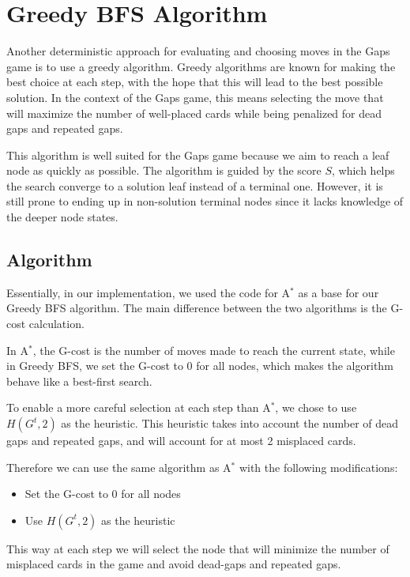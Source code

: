 \chapter{Greedy BFS Algorithm}
Another deterministic approach for evaluating and choosing moves in the Gaps game is to use a greedy algorithm. Greedy algorithms are known for making the best choice at each step, with the hope that this will lead to the best possible solution. In the context of the Gaps game, this means selecting the move that will maximize the number of well-placed cards while being penalized for dead gaps and repeated gaps.

This algorithm is well suited for the Gaps game because we aim to reach a leaf node as quickly as possible. The algorithm is guided by the score $S$, which helps the search converge to a solution leaf instead of a terminal one. However, it is still prone to ending up in non-solution terminal nodes since it lacks knowledge of the deeper node states.

\section{Algorithm}
Essentially, in our implementation, we used the code for A$^*$ as a base for our Greedy BFS algorithm. The main difference between the two algorithms is the G-cost calculation.

In A$^*$, the G-cost is the number of moves made to reach the current state, while in Greedy BFS, we set the G-cost to 0 for all nodes, which makes the algorithm behave like a best-first search.

To enable a more careful selection at each step than A$^*$, we chose to use $H(G^t, 2)$ as the heuristic. This heuristic takes into account the number of dead gaps and repeated gaps, and will account for at most 2 misplaced cards.

Therefore we can use the same algorithm as A$^*$ with the following modifications:
\begin{itemize}
    \item Set the G-cost to 0 for all nodes
    \item Use $H(G^t, 2)$ as the heuristic
\end{itemize}

This way at each step we will select the node that will minimize the number of misplaced cards in the game and avoid dead-gaps and repeated gaps.

